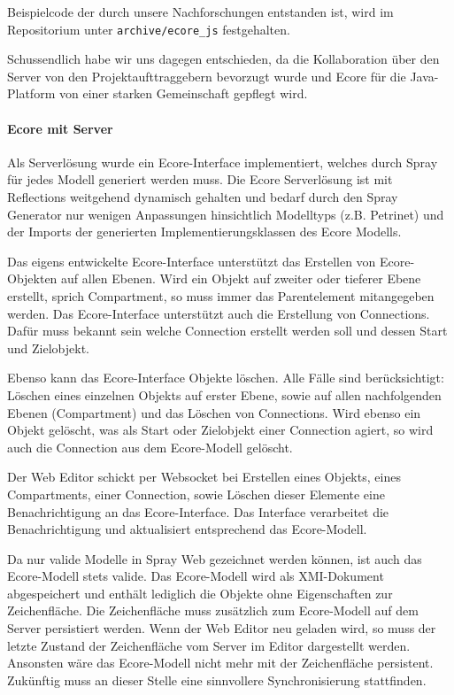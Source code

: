 Beispielcode der durch unsere Nachforschungen entstanden ist, wird im Repositorium
unter {\tt archive/ecore\_js} festgehalten.

Schussendlich habe wir uns dagegen entschieden, da die Kollaboration
über den Server von den Projektaufttraggebern bevorzugt wurde und
Ecore für die Java-Platform von einer starken Gemeinschaft gepflegt wird.

\paragraph{Ecore mit Server}
Als Serverlösung wurde ein Ecore-Interface implementiert, welches durch Spray
für jedes Modell generiert werden muss. Die Ecore Serverlösung ist mit Reflections weitgehend
dynamisch gehalten und bedarf durch den Spray Generator nur wenigen Anpassungen hinsichtlich
Modelltyps (z.B. Petrinet) und der Imports der generierten Implementierungsklassen des Ecore Modells.

Das eigens entwickelte Ecore-Interface unterstützt das Erstellen von Ecore-Objekten auf allen Ebenen.
Wird ein Objekt auf zweiter oder tieferer Ebene erstellt, sprich Compartment, so muss immer das Parentelement
mitangegeben werden. Das Ecore-Interface unterstützt auch die Erstellung von Connections. Dafür muss
bekannt sein welche Connection erstellt werden soll und dessen Start und Zielobjekt.

Ebenso kann das Ecore-Interface Objekte löschen. Alle Fälle sind berücksichtigt: Löschen eines einzelnen Objekts
auf erster Ebene, sowie auf allen nachfolgenden Ebenen (Compartment) und das Löschen von Connections. Wird ebenso 
ein Objekt gelöscht, was als Start oder Zielobjekt einer Connection agiert, so wird auch die Connection aus dem
Ecore-Modell gelöscht.

Der Web Editor schickt per Websocket bei Erstellen eines Objekts, eines Compartments, einer
Connection, sowie Löschen dieser Elemente eine Benachrichtigung an das Ecore-Interface. Das Interface verarbeitet
die Benachrichtigung und aktualisiert entsprechend das Ecore-Modell.

Da nur valide Modelle in Spray Web gezeichnet werden können, ist auch das Ecore-Modell stets valide.
Das Ecore-Modell wird als XMI-Dokument abgespeichert und enthält lediglich die Objekte ohne
Eigenschaften zur Zeichenfläche. Die Zeichenfläche muss zusätzlich zum Ecore-Modell auf dem Server persistiert werden.
Wenn der Web Editor neu geladen wird, so muss der letzte Zustand der Zeichenfläche vom Server im Editor dargestellt
werden. Ansonsten wäre das Ecore-Modell nicht mehr mit der Zeichenfläche persistent. Zukünftig muss an dieser Stelle
eine sinnvollere Synchronisierung stattfinden.

